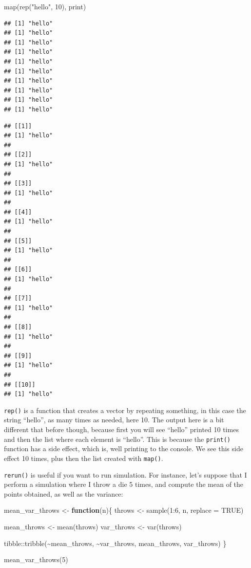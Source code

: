 \documentclass[
]{article}
\newenvironment{Shaded}{\begin{snugshade}}{\end{snugshade}}
\newcommand{\AttributeTok}[1]{\textcolor[rgb]{0.77,0.63,0.00}{#1}}
\newcommand{\ConstantTok}[1]{\textcolor[rgb]{0.00,0.00,0.00}{#1}}
\newcommand{\ControlFlowTok}[1]{\textcolor[rgb]{0.13,0.29,0.53}{\textbf{#1}}}
\newcommand{\DecValTok}[1]{\textcolor[rgb]{0.00,0.00,0.81}{#1}}
\newcommand{\FunctionTok}[1]{\textcolor[rgb]{0.00,0.00,0.00}{#1}}
\newcommand{\NormalTok}[1]{#1}
\newcommand{\OtherTok}[1]{\textcolor[rgb]{0.56,0.35,0.01}{#1}}
\newcommand{\SpecialCharTok}[1]{\textcolor[rgb]{0.00,0.00,0.00}{#1}}
\newcommand{\StringTok}[1]{\textcolor[rgb]{0.31,0.60,0.02}{#1}}
\begin{document}
\begin{Shaded}
\begin{Highlighting}[]
\FunctionTok{map}\NormalTok{(}\FunctionTok{rep}\NormalTok{(}\StringTok{"hello"}\NormalTok{, }\DecValTok{10}\NormalTok{), print)}
\end{Highlighting}
\end{Shaded}

\begin{verbatim}
## [1] "hello"
## [1] "hello"
## [1] "hello"
## [1] "hello"
## [1] "hello"
## [1] "hello"
## [1] "hello"
## [1] "hello"
## [1] "hello"
## [1] "hello"
\end{verbatim}

\begin{verbatim}
## [[1]]
## [1] "hello"
## 
## [[2]]
## [1] "hello"
## 
## [[3]]
## [1] "hello"
## 
## [[4]]
## [1] "hello"
## 
## [[5]]
## [1] "hello"
## 
## [[6]]
## [1] "hello"
## 
## [[7]]
## [1] "hello"
## 
## [[8]]
## [1] "hello"
## 
## [[9]]
## [1] "hello"
## 
## [[10]]
## [1] "hello"
\end{verbatim}

\texttt{rep()} is a function that creates a vector by repeating something, in this case the string ``hello'',
as many times as needed, here 10. The output here is a bit different that before though, because first
you will see ``hello'' printed 10 times and then the list where each element is ``hello''.
This is because the \texttt{print()} function has a side effect, which is, well printing to the console.
We see this side effect 10 times, plus then the list created with \texttt{map()}.

\texttt{rerun()} is useful if you want to run simulation. For instance, let's suppose that I perform a simulation
where I throw a die 5 times, and compute the mean of the points obtained, as well as the variance:

\begin{Shaded}
\begin{Highlighting}[]
\NormalTok{mean\_var\_throws }\OtherTok{\textless{}{-}} \ControlFlowTok{function}\NormalTok{(n)\{}
\NormalTok{  throws }\OtherTok{\textless{}{-}} \FunctionTok{sample}\NormalTok{(}\DecValTok{1}\SpecialCharTok{:}\DecValTok{6}\NormalTok{, n, }\AttributeTok{replace =} \ConstantTok{TRUE}\NormalTok{)}

\NormalTok{  mean\_throws }\OtherTok{\textless{}{-}} \FunctionTok{mean}\NormalTok{(throws)}
\NormalTok{  var\_throws }\OtherTok{\textless{}{-}} \FunctionTok{var}\NormalTok{(throws)}

\NormalTok{  tibble}\SpecialCharTok{::}\FunctionTok{tribble}\NormalTok{(}\SpecialCharTok{\textasciitilde{}}\NormalTok{mean\_throws, }\SpecialCharTok{\textasciitilde{}}\NormalTok{var\_throws,}
\NormalTok{                   mean\_throws, var\_throws)}
\NormalTok{\}}

\FunctionTok{mean\_var\_throws}\NormalTok{(}\DecValTok{5}\NormalTok{)}
\end{Highlighting}
\end{Shaded}
\end{document}
